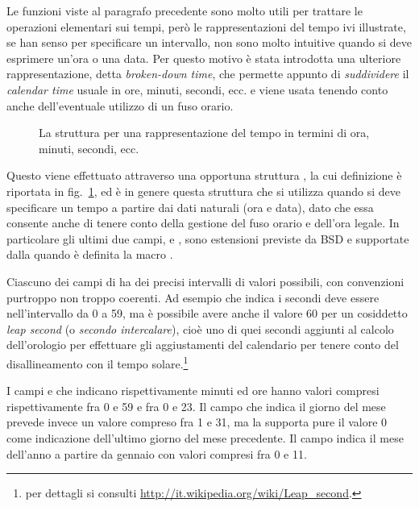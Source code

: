 Le funzioni viste al paragrafo precedente sono molto utili per trattare le
operazioni elementari sui tempi, però le rappresentazioni del tempo ivi
illustrate, se han senso per specificare un intervallo, non sono molto
intuitive quando si deve esprimere un'ora o una data.  Per questo motivo è
stata introdotta una ulteriore rappresentazione, detta \textit{broken-down
  time}, che permette appunto di \textsl{suddividere} il \textit{calendar
  time} usuale in ore, minuti, secondi, ecc. e  viene usata tenendo conto
anche dell'eventuale utilizzo di un fuso orario.

\begin{figure}[!htb]
  \footnotesize \centering
  \begin{minipage}[c]{.8\textwidth}
  \end{minipage} 
  \normalsize 
  \caption{La struttura  per una rappresentazione del tempo in
    termini di ora, minuti, secondi, ecc.}
  \label{fig:sys_tm_struct}
\end{figure}

Questo viene effettuato attraverso una opportuna struttura , la cui
definizione è riportata in fig.~\ref{fig:sys_tm_struct}, ed è in genere questa
struttura che si utilizza quando si deve specificare un tempo a partire dai
dati naturali (ora e data), dato che essa consente anche di tenere conto della
gestione del fuso orario e dell'ora legale. In particolare gli ultimi due
campi,  e , sono estensioni previste da BSD e
supportate dalla  quando è definita la macro .

Ciascuno dei campi di  ha dei precisi intervalli di valori
possibili, con convenzioni purtroppo non troppo coerenti. Ad esempio
 che indica i secondi deve essere nell'intervallo da 0 a 59, ma è
possibile avere anche il valore 60 per un cosiddetto \textit{leap second} (o
\textsl{secondo intercalare}), cioè uno di quei secondi aggiunti al calcolo
dell'orologio per effettuare gli aggiustamenti del calendario per tenere conto
del disallineamento con il tempo solare.\footnote{per dettagli si consulti
  \url{http://it.wikipedia.org/wiki/Leap_second}.}

I campi  e che indicano rispettivamente minuti ed
ore hanno valori compresi rispettivamente fra 0 e 59 e fra 0 e 23. Il campo
 che indica il giorno del mese prevede invece un valore compreso
fra 1 e 31, ma la  supporta pure il valore 0 come indicazione
dell'ultimo giorno del mese precedente. Il campo  indica il mese
dell'anno a partire da gennaio con valori compresi fra 0 e 11.


